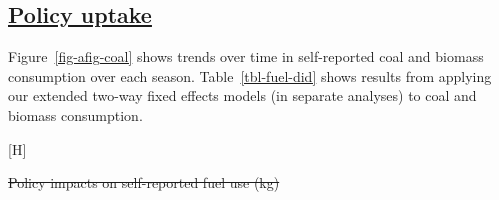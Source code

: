 \documentclass[
  letterpaper,
  DIV=11,
  numbers=noendperiod]{scrartcl}
\makeatletter
\renewenvironment{table}%
   {\renewcommand\familydefault\sfdefault
    \@float{table}}
   {\end@float}
\renewenvironment{figure}%
   {\renewcommand\familydefault\sfdefault
    \@float{figure}}
   {\end@float}
\providecommand{\DIFadd}[1]{{\protect\color{blue}\underline{#1}}} %
\providecommand{\DIFdel}[1]{{\protect\color{red}\sout{#1}}}                      %
\providecommand{\DIFaddbegin}{} %
\providecommand{\DIFaddend}{} %
\providecommand{\DIFdelbegin}{} %
\providecommand{\DIFdelend}{} %
\providecommand{\DIFdelFL}[1]{\DIFdel{#1}} %
\providecommand{\DIFaddbeginFL}{} %
\providecommand{\DIFaddendFL}{} %
\providecommand{\DIFdelbeginFL}{} %
\providecommand{\DIFdelendFL}{} %
\newcommand{\DIFscaledelfig}{0.5}
\newlength{\DIFdelgraphicswidth} %
\newlength{\DIFdelgraphicsheight} %
\newcommand{\DIFaddincludegraphics}[2][]{{\color{blue}\fbox{\DIFOincludegraphics[#1]{#2}}}} %
\newcommand{\DIFdelincludegraphics}[2][]{%
\sbox{\DIFdelgraphicsbox}{\DIFOincludegraphics[#1]{#2}}%
\settoboxwidth{\DIFdelgraphicswidth}{\DIFdelgraphicsbox} %
\settoboxtotalheight{\DIFdelgraphicsheight}{\DIFdelgraphicsbox} %
\scalebox{\DIFscaledelfig}{%
\parbox[b]{\DIFdelgraphicswidth}{\usebox{\DIFdelgraphicsbox}\\[-\baselineskip] \rule{\DIFdelgraphicswidth}{0em}}\llap{\resizebox{\DIFdelgraphicswidth}{\DIFdelgraphicsheight}{%
\setlength{\unitlength}{\DIFdelgraphicswidth}%
\begin{picture}(1,1)%
\thicklines\linethickness{2pt} %
{\color[rgb]{1,0,0}\put(0,0){\framebox(1,1){}}}%
{\color[rgb]{1,0,0}\put(0,0){\line( 1,1){1}}}%
{\color[rgb]{1,0,0}\put(0,1){\line(1,-1){1}}}%
\end{picture}%
}\hspace*{3pt}}} %
} %
\DeclareRobustCommand{\DIFaddbegin}{\DIFOaddbegin \let\includegraphics\DIFaddincludegraphics} %
\DeclareRobustCommand{\DIFaddend}{\DIFOaddend \let\includegraphics\DIFOincludegraphics} %
\DeclareRobustCommand{\DIFdelbegin}{\DIFOdelbegin \let\includegraphics\DIFdelincludegraphics} %
\DeclareRobustCommand{\DIFdelend}{\DIFOaddend \let\includegraphics\DIFOincludegraphics} %
\DeclareRobustCommand{\DIFaddbeginFL}{\DIFOaddbeginFL \let\includegraphics\DIFaddincludegraphics} %
\DeclareRobustCommand{\DIFaddendFL}{\DIFOaddendFL \let\includegraphics\DIFOincludegraphics} %
\DeclareRobustCommand{\DIFdelbeginFL}{\DIFOdelbeginFL \let\includegraphics\DIFdelincludegraphics} %
\DeclareRobustCommand{\DIFdelendFL}{\DIFOaddendFL \let\includegraphics\DIFOincludegraphics} %
\makeatother
\begin{document}
\newpage

\newpage

\DIFdelbegin %
\DIFdelend \DIFaddbegin \subsection{\DIFadd{Policy uptake}}\label{policy-uptake-1}
\DIFaddend 

Figure~\ref{fig-afig-coal} shows trends over time in self-reported coal
and biomass consumption over each season. Table~\ref{tbl-fuel-did} shows
results from applying our extended two-way fixed effects models (in
separate analyses) to coal and biomass consumption.

\begin{figure}[H]

\DIFdelbeginFL %
\DIFdelendFL \DIFaddbeginFL {}
\DIFaddendFL 

\DIFdelbeginFL %

\DIFdelendFL \caption{\label{fig-afig-coal}Trends in self-reported coal and biomass,
by treatment season}

\end{figure}%

\DIFdelbegin %
{%
\DIFdelFL{Policy impacts on self-reported fuel use (kg) }}%
\end{document}
